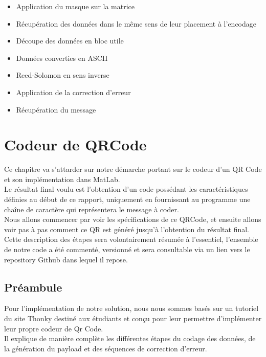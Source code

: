 \documentclass{report}
\begin{document}
			\begin{itemize}
				\item Application du masque sur la matrice
				\item Récupération des données dans le même sens de leur placement à l'encodage
				\item Découpe des données en bloc utile
				\item Données converties en ASCII
				\item Reed-Solomon en sens inverse
				\item Application de la correction d'erreur
				\item Récupération du message
			\end{itemize}


\chapter{Codeur de QRCode}
	
	Ce chapitre va s'attarder sur notre démarche portant sur le codeur d'un QR Code et son implémentation dans MatLab.\\
	Le résultat final voulu est l'obtention d'un code possédant les caractéristiques définies au début de ce rapport, uniquement en fournissant au programme une chaîne de caractère qui représentera le message à coder.\\

	Nous allons commencer par voir les spécifications de ce QRCode, et ensuite allons voir pas à pas comment ce QR est généré jusqu'à l'obtention du résultat final.\\

	Cette description des étapes sera volontairement résumée à l'essentiel, l'ensemble de notre code a été commenté, versionné et sera consultable via un lien vers le repository Github dans lequel il repose.\\

	\section{Préambule}

		Pour l'implémentation de notre solution, nous nous sommes basés sur un tutoriel du site Thonky destiné aux étudiants et conçu pour leur permettre d'implémenter leur propre codeur de Qr Code.\\
		Il explique de manière complète les différentes étapes du codage des données, de la génération du payload et des séquences de correction d'erreur.\\
\end{document}
